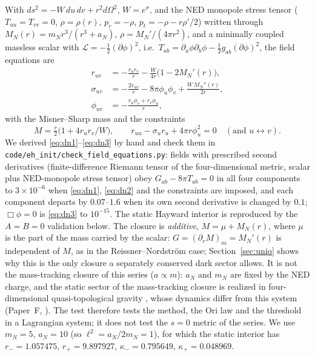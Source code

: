 \documentclass[11pt]{article}
\begin{document}
With $ds^2=-W\,du\,dv+r^2d\Omega^2$, $W=e^{\sigma}$, and the NED monopole stress tensor ($T_{uu}=T_{vv}=0$, $\rho=\rho(r)$, $p_r=-\rho$, $p_t=-\rho-r\rho'/2$) written through $M_N(r)=m_Nr^3/(r^3+a_N)$, $\rho=M_N'/(4\pi r^2)$, and a minimally coupled massless scalar with $\mathcal L=-\tfrac12(\partial\phi)^2$, i.e.\ $T_{ab}=\partial_a\phi\partial_b\phi-\tfrac12g_{ab}(\partial\phi)^2$, the field equations are
\begin{align}
r_{uv}&=-\frac{r_ur_v}{r}-\frac{W}{4r}\bigl(1-2M_N'(r)\bigr), \label{eq:dn1}\\
\sigma_{uv}&=-\frac{2r_{uv}}{r}-8\pi\phi_u\phi_v+\frac{W\,M_N''(r)}{2r},\label{eq:dn2}\\
\phi_{uv}&=-\frac{r_u\phi_v+r_v\phi_u}{r},\label{eq:dn3}
\end{align}
with the Misner--Sharp mass and the constraints
\begin{equation}
M=\tfrac r2\bigl(1+4r_ur_v/W\bigr),\qquad r_{uu}-\sigma_ur_u+4\pi r\phi_u^2=0\quad(\text{and }u\leftrightarrow v).
\end{equation} We derived \eqref{eq:dn1}--\eqref{eq:dn3} by hand and check them in \texttt{code/eh\_init/check\_field\_equations.py}: fields with prescribed second derivatives (finite-difference Riemann tensor of the four-dimensional metric, scalar plus NED-monopole stress tensor) obey $G_{ab}-8\pi T_{ab}=0$ in all four components to $3\times10^{-6}$ when \eqref{eq:dn1}, \eqref{eq:dn2} and the constraints are imposed, and each component departs by $0.07$--$1.6$ when its own second derivative is changed by $0.1$; $\Box\phi=0$ is \eqref{eq:dn3} to $10^{-15}$. The static Hayward interior is reproduced by the $A=B=0$ validation below. The closure is \emph{additive}, $M=\mu+M_N(r)$, where $\mu$ is the part of the mass carried by the scalar: $G=(\partial_rM)_m=M_N'(r)$ is independent of $M$, as in the Reissner--Nordstr\"om case; Section~\ref{sec:uniq} shows why this is the only closure a separately conserved dark sector allows. It is not the mass-tracking closure of this series ($a\propto m$): $a_N$ and $m_N$ are fixed by the NED charge, and the static sector of the mass-tracking closure is realized in four-dimensional quasi-topological gravity \citep{BorissovaCarballoRubio2026,BuenoCanoHennigar2024}, whose dynamics differ from this system (Paper~F, \citealp{PaperF}). The test therefore tests the method, the Ori law and the threshold in a Lagrangian system; it does not test the $s=0$ metric of the series. We use $m_N=5$, $a_N=10$ (so $\ell^2=a_N/2m_N=1$), for which the static interior has $r_-=1.057475$, $r_+=9.897927$, $\kappa_-=0.795649$, $\kappa_+=0.048969$.
\end{document}
